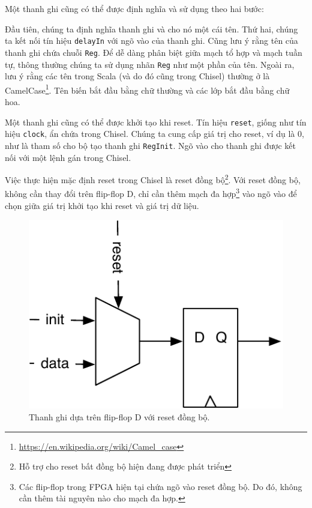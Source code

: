 \documentclass[%
    10pt,
    headinclude, footexclude,
    openright, %
    notitlepage,
    cleardoubleempty,
    headsepline,
    pointlessnumbers,
    bibtotoc, idxtotoc,
    ]{scrbook}
\newcommand{\code}[1]{{\small{\texttt{#1}}}}
\newcommand{\scale}{0.7}
\newcommand{\myref}[2]{\href{#1}{#2}}
\renewcommand{\myref}[2]{{#2}{\footnote{\url{#1}}}}
\begin{document}
Một thanh ghi cũng có thể được định nghĩa và sử dụng theo hai bước:


Đầu tiên, chúng ta định nghĩa thanh ghi và cho nó một cái tên. Thứ hai, chúng ta kết 
nối tín hiệu \code{delayIn} với ngõ vào của thanh ghi. Cũng lưu ý rằng tên của thanh ghi 
chứa chuỗi \code{Reg}. Để dễ dàng phân biệt giữa mạch tổ hợp và mạch tuần tự, thông thường 
chúng ta sử dụng nhãn \code{Reg} như một phần của tên. Ngoài ra, lưu ý rằng các tên 
trong Scala (và do đó cũng trong Chisel) thường ở là
\myref{https://en.wikipedia.org/wiki/Camel_case}{CamelCase}.
Tên biến bắt đầu bằng chữ thường và các lớp bắt đầu bằng chữ hoa.

Một thanh ghi cũng có thể được khởi tạo khi reset. Tín hiệu \code{reset}, giống như tín hiệu \code{clock}, 
ẩn chứa trong Chisel. Chúng ta cung cấp giá trị cho reset, ví dụ là 0, như là tham số cho bộ 
tạo thanh ghi \code{RegInit}. Ngõ vào cho thanh ghi được kết nối với một lệnh gán trong Chisel.


Việc thực hiện mặc định reset trong Chisel là reset đồng bộ\footnote{Hỗ trợ cho reset bất đồng bộ 
hiện đang được phát triển}. Với reset đồng bộ, không cần thay đổi trên flip-flop D, chỉ cần thêm mạch đa 
hợp\footnote{Các flip-flop trong FPGA hiện tại chứa ngõ vào reset đồng bộ.
Do đó, không cần thêm tài nguyên nào cho mạch đa hợp.} vào ngõ vào để chọn 
giữa giá trị khởi tạo khi reset và giá trị dữ liệu.

\begin{figure}
  \centering
  \includegraphics[scale=\scale]{figures/register-reset}
  \caption{Thanh ghi dựa trên flip-flop D với reset đồng bộ.}
  \label{fig:register-reset}
\end{figure}
\end{document}
